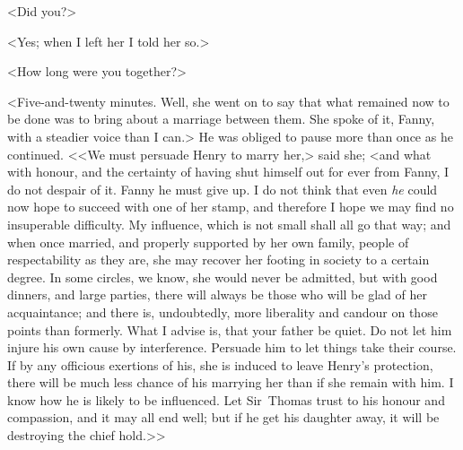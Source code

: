 <Did you?>

<Yes; when I left her I told her so.>

<How long were you together?>

<Five-and-twenty minutes. Well, she went on to say that what remained now to be done was to bring about a marriage between them. She spoke of it, Fanny, with a steadier voice than I can.> He was obliged to pause more than once as he continued. <<We must persuade Henry to marry her,> said she; <and what with honour, and the certainty of having shut himself out for ever from Fanny, I do not despair of it. Fanny he must give up. I do not think that even \textit{he}  could now hope to succeed with one of her stamp, and therefore I hope we may find no insuperable difficulty. My influence, which is not small shall all go that way; and when once married, and properly supported by her own family, people of respectability as they are, she may recover her footing in society to a certain degree. In some circles, we know, she would never be admitted, but with good dinners, and large parties, there will always be those who will be glad of her acquaintance; and there is, undoubtedly, more liberality and candour on those points than formerly. What I advise is, that your father be quiet. Do not let him injure his own cause by interference. Persuade him to let things take their course. If by any officious exertions of his, she is induced to leave Henry's protection, there will be much less chance of his marrying her than if she remain with him. I know how he is likely to be influenced. Let Sir~Thomas trust to his honour and compassion, and it may all end well; but if he get his daughter away, it will be destroying the chief hold.>>

